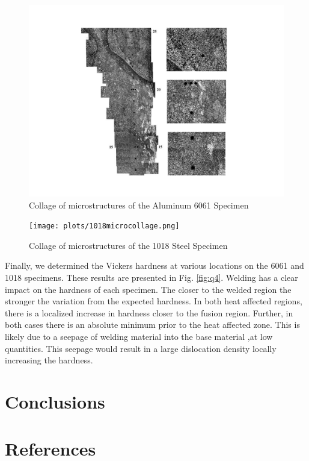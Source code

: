 \documentclass{article}
\begin{document}
\begin{figure}[!hp!]
    \centering
    \includegraphics[width=1\linewidth]{plots/6061microcollage.png}
    \caption{Collage of microstructures of the Aluminum 6061 Specimen}
    \label{fig:6061}
\end{figure}
\begin{figure}[!hp!]
    \centering
    \texttt{[image: plots/1018microcollage.png]}
    \caption{Collage of microstructures of the 1018 Steel Specimen}
    \label{fig:1018}
\end{figure}

Finally, we determined the Vickers hardness at various locations on the 6061 and 1018 specimens. These results are presented in Fig. \ref{fig:q4}.
Welding has a clear impact on the hardness of each specimen. The closer to the welded region the stronger the variation from the expected hardness. In both heat affected regions, there is a localized increase in hardness closer to the fusion region. Further, in both cases there is an absolute minimum prior to the heat affected zone. This is likely due to a seepage of welding material into the base material ,at low quantities. This seepage would result in a large dislocation density locally increasing the hardness.

\section{Conclusions}

\section{References}

\printbibliography[heading = none]
\end{document}
